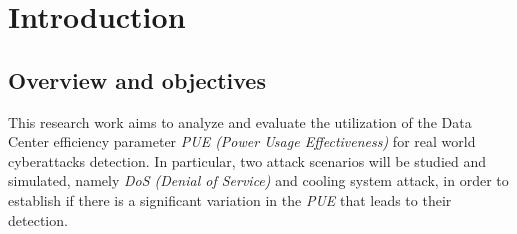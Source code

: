 \chapter{Introduction}

\begin{citazione}

\end{citazione}
\newpage

\section{Overview and objectives} 
This research work aims to analyze and evaluate the utilization of the Data Center efficiency parameter \emph{PUE (Power Usage Effectiveness)} for real world cyberattacks detection. In particular, two attack scenarios will be studied and simulated, namely \emph{DoS (Denial of Service)} and cooling system attack, in order to establish if there is a significant variation in the \emph{PUE} that leads to their detection. 


